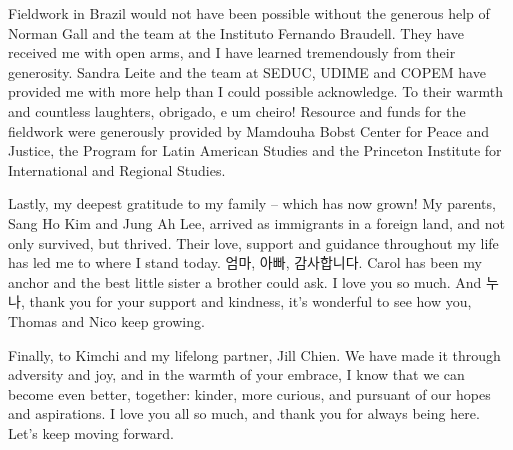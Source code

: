 Fieldwork in Brazil would not have been possible without the generous help of Norman Gall and the team at the Instituto Fernando Braudell. They have received me with open arms, and I have learned tremendously from their generosity. Sandra Leite and the team at SEDUC, UDIME and COPEM have provided me with more help than I could possible acknowledge. To their warmth and countless laughters, obrigado, e um cheiro! Resource and funds for the fieldwork were generously provided by Mamdouha Bobst Center for Peace and Justice, the Program for Latin American Studies and the Princeton Institute for International and Regional Studies.

Lastly, my deepest gratitude to my family -- which has now grown! My parents, Sang Ho Kim and Jung Ah Lee, arrived as immigrants in a foreign land, and not only survived, but thrived. Their love, support and guidance throughout my life has led me to where I stand today. 엄마, 아빠, 감사합니다. Carol has been my anchor and the best little sister a brother could ask. I love you so much. And 누나, thank you for your support and kindness, it's wonderful to see how you, Thomas and Nico keep growing.

Finally, to Kimchi and my lifelong partner, Jill Chien. We have made it through adversity and joy, and in the warmth of your embrace, I know that we can become even better, together: kinder, more curious, and pursuant of our hopes and aspirations. I love you all so much, and thank you for always being here. Let's keep moving forward.
